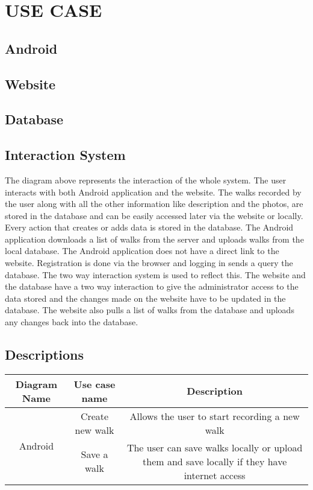 \documentclass[12pt]{article}
\begin{document}
\section{USE CASE}
\subsection{Android}
\subsection{Website}
\subsection{Database}
\subsection{Interaction System}
The diagram above represents the interaction of the whole system. The user interacts with
both Android application and the website. The walks recorded by the user along with all the
other information like description and the photos, are stored in the database and can be easily
accessed later via the website or locally. Every action that creates or adds data is stored in the
database.
The Android application downloads a list of walks from the server and uploads walks from
the local database. The Android application does not have a direct link to the website.
Registration is done via the browser and logging in sends a query the database. The two way
interaction system is used to reflect this. The website and the database have a two way
interaction to give the administrator access to the data stored and the changes made on the
website have to be updated in the database. The website also pulls a list of walks from the
database and uploads any changes back into the database.
\newpage
\begin{landscape}
\subsection{Descriptions}
\begin{tabular}{|c|c|c|}
\hline
	Diagram Name & Use case name  & Description \\
\hline

 \multirow{4}{*}{Android} & \multicolumn{1}{|c|}{Create new walk} & \multicolumn{1}{|c|}{Allows the user to start recording a new walk} \\\cline{2-3} & \multicolumn{1}{|c|}{Save a walk 
} & \multicolumn{1}{|c|}{The user can save walks locally or upload them and save locally
if they have internet access}


\end{tabular}
\end{landscape}
\newpage
\end{document}
